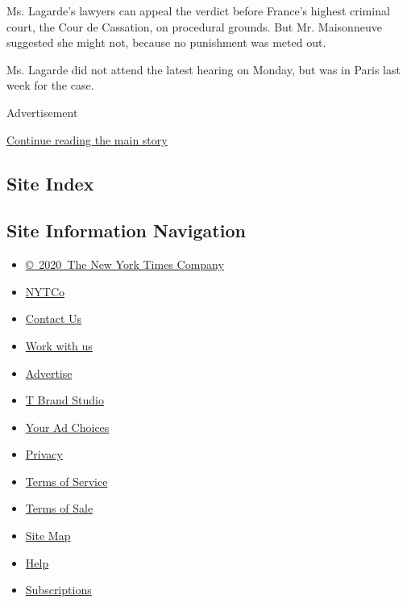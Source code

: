 Ms. Lagarde's lawyers can appeal the verdict before France's highest
criminal court, the Cour de Cassation, on procedural grounds. But Mr.
Maisonneuve suggested she might not, because no punishment was meted
out.

Ms. Lagarde did not attend the latest hearing on Monday, but was in
Paris last week for the case.

Advertisement

\protect\hyperlink{after-bottom}{Continue reading the main story}

\hypertarget{site-index}{%
\subsection{Site Index}\label{site-index}}

\hypertarget{site-information-navigation}{%
\subsection{Site Information
Navigation}\label{site-information-navigation}}

\begin{itemize}
\tightlist
\item
  \href{https://help.nytimes3xbfgragh.onion/hc/en-us/articles/115014792127-Copyright-notice}{©~2020~The
  New York Times Company}
\end{itemize}

\begin{itemize}
\tightlist
\item
  \href{https://www.nytco.com/}{NYTCo}
\item
  \href{https://help.nytimes3xbfgragh.onion/hc/en-us/articles/115015385887-Contact-Us}{Contact
  Us}
\item
  \href{https://www.nytco.com/careers/}{Work with us}
\item
  \href{https://nytmediakit.com/}{Advertise}
\item
  \href{http://www.tbrandstudio.com/}{T Brand Studio}
\item
  \href{https://www.nytimes3xbfgragh.onion/privacy/cookie-policy\#how-do-i-manage-trackers}{Your
  Ad Choices}
\item
  \href{https://www.nytimes3xbfgragh.onion/privacy}{Privacy}
\item
  \href{https://help.nytimes3xbfgragh.onion/hc/en-us/articles/115014893428-Terms-of-service}{Terms
  of Service}
\item
  \href{https://help.nytimes3xbfgragh.onion/hc/en-us/articles/115014893968-Terms-of-sale}{Terms
  of Sale}
\item
  \href{https://spiderbites.nytimes3xbfgragh.onion}{Site Map}
\item
  \href{https://help.nytimes3xbfgragh.onion/hc/en-us}{Help}
\item
  \href{https://www.nytimes3xbfgragh.onion/subscription?campaignId=37WXW}{Subscriptions}
\end{itemize}
